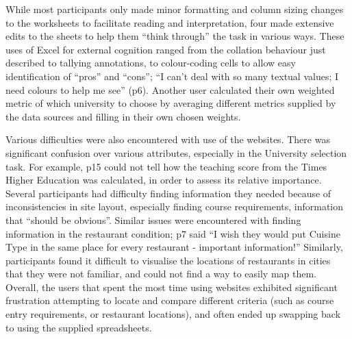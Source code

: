 \documentclass{sigchi}
\begin{document}
While most participants only made minor formatting and column sizing changes to the worksheets to facilitate reading and interpretation,  four made extensive edits to the sheets to help them ``think through'' the task in various ways.  These uses of Excel for external cognition ranged from the collation behaviour just described to tallying annotations, to colour-coding cells to allow easy identification of  ``pros'' and ``cons''; ``I can't deal with so many textual values; I need colours to help me see'' (p6). Another user calculated their own weighted metric of which university to choose by averaging different metrics supplied by the data sources and filling in their own chosen weights.  


Various difficulties were also encountered with use of the websites. There was significant confusion over various attributes, especially in the University selection task.  For example, p15 could not tell how the teaching score from the Times Higher Education was calculated, in order to assess its relative importance.  Several participants had difficulty finding information they needed because of inconsistencies in site layout, especially finding course requirements, information that ``should be obvious''.  Similar issues were encountered with finding information in the restaurant condition; p7 said ``I wish they would put Cuisine Type in the same place for every restaurant - important information!'' Similarly, participants found it difficult to visualise the locations of restaurants in cities that they were not familiar, and could not find a way to easily map them. Overall, the users that spent the most time using websites exhibited significant frustration attempting to locate and compare different criteria (such as course entry requirements, or restaurant locations), and often ended up swapping back to using the supplied spreadsheets.


\end{document}
